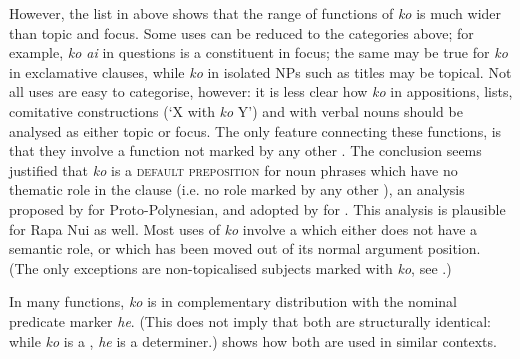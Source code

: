 However, the list in  above shows that the range of functions of \textit{ko} is much wider than topic and focus. Some uses can be reduced to the categories above; for example, \textit{ko ai} in questions is a constituent in focus; the same may be true for \textit{ko} in exclamative clauses, while \textit{ko} in isolated NPs such as titles may be topical. Not all uses are easy to categorise, however: it is less clear how \textit{ko} in appositions, lists, comitative constructions (‘X with \textit{ko} Y’) and with verbal nouns should be analysed as either topic or focus. The only feature connecting these functions, is that they involve a function not marked by any other . The conclusion seems justified that \textit{ko} is a \textsc{default preposition} for noun phrases which have no thematic role in the clause (i.e. no role marked by any other ), an analysis proposed by \citet[45]{Clark1976} for Proto-Polynesian, and adopted by \citet{MassamLee2006} for . This analysis is plausible for Rapa Nui as well. Most uses of \textit{ko} involve a  which either does not have a semantic role, or which has been moved out of its normal argument position. (The only exceptions are non-topicalised subjects marked with \textit{ko}, see .)

In many functions, \textit{ko} is in complementary distribution with the nominal predicate marker \textit{he}. (This does not imply that both are structurally identical: while \textit{ko} is a , \textit{he} is a determiner.)  shows how both are used in similar contexts.

